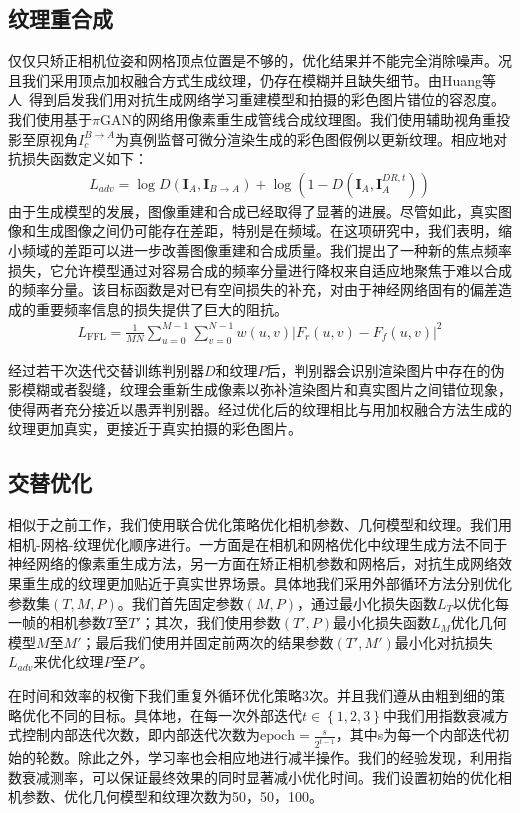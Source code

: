\subsection{纹理重合成}
仅仅只矫正相机位姿和网格顶点位置是不够的，优化结果并不能完全消除噪声。况且我们采用顶点加权融合方式生成纹理，仍存在模糊并且缺失细节。由Huang等人~\cite{JingweiHuang2020AdversarialTO}得到启发我们用对抗生成网络学习重建模型和拍摄的彩色图片错位的容忍度。我们使用基于$\pi$GAN\cite{chanmonteiro2020pi-GAN}的网络用像素重生成管线合成纹理图。我们使用辅助视角重投影至原视角$I_c^{B\to A}$为真例监督可微分渲染生成的彩色图假例以更新纹理。相应地对抗损失函数定义如下：
\begin{align}
	L_{a d v}=\log D\left(\boldsymbol{I}_{A}, \boldsymbol{I}_{B \rightarrow A}\right)+\log \left(1-D\left(\boldsymbol{I}_{A}, \boldsymbol{I}_{A}^{D R, t}\right)\right) 
\end{align}
由于生成模型的发展，图像重建和合成已经取得了显著的进展。尽管如此，真实图像和生成图像之间仍可能存在差距，特别是在频域。在这项研究中，我们表明，缩小频域的差距可以进一步改善图像重建和合成质量。我们提出了一种新的焦点频率损失，它允许模型通过对容易合成的频率分量进行降权来自适应地聚焦于难以合成的频率分量。该目标函数是对已有空间损失的补充，对由于神经网络固有的偏差造成的重要频率信息的损失提供了巨大的阻抗。
\begin{align}
	L_\mathrm{FFL}=\frac{1}{M N} \sum_{u=0}^{M-1} \sum_{v=0}^{N-1} w(u, v)\left|F_{r}(u, v)-F_{f}(u, v)\right|^{2}
\end{align}

经过若干次迭代交替训练判别器$D$和纹理$P$后，判别器会识别渲染图片中存在的伪影模糊或者裂缝，纹理会重新生成像素以弥补渲染图片和真实图片之间错位现象，使得两者充分接近以愚弄判别器。经过优化后的纹理相比与用加权融合方法生成的纹理更加真实，更接近于真实拍摄的彩色图片。
\subsection{交替优化}
相似于之前工作，我们使用联合优化策略优化相机参数、几何模型和纹理。我们用相机-网格-纹理优化顺序进行。一方面是在相机和网格优化中纹理生成方法不同于神经网络的像素重生成方法，另一方面在矫正相机参数和网格后，对抗生成网络效果重生成的纹理更加贴近于真实世界场景。具体地我们采用外部循环方法分别优化参数集$(T,M,P)$。我们首先固定参数$(M,P)$，通过最小化损失函数$L_T$以优化每一帧的相机参数$T$至$T'$；其次，我们使用参数$(T',P)$最小化损失函数$L_M$优化几何模型$M$至$M'$；最后我们使用并固定前两次的结果参数$(T',M')$最小化对抗损失$L_{adv}$来优化纹理$P$至$P'$。\par
在时间和效率的权衡下我们重复外循环优化策略3次。并且我们遵从由粗到细的策略优化不同的目标。具体地，在每一次外部迭代$t\in \left \{ 1,2,3 \right \}$中我们用指数衰减方式控制内部迭代次数，即内部迭代次数为$\text{epoch}  =\frac{s}{2^{t-1}}$，其中s为每一个内部迭代初始的轮数。除此之外，学习率也会相应地进行减半操作。我们的经验发现，利用指数衰减测率，可以保证最终效果的同时显著减小优化时间。我们设置初始的优化相机参数、优化几何模型和纹理次数为50，50，100。

